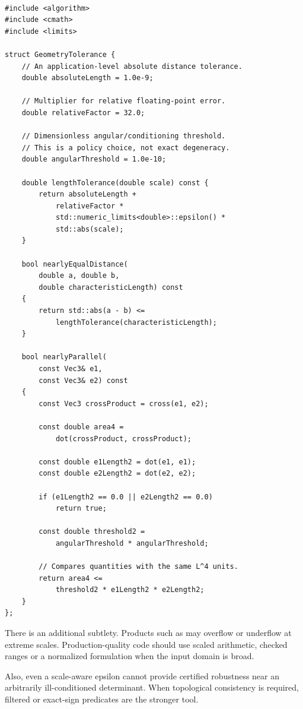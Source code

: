 \begin{verbatim}

#include <algorithm>
#include <cmath>
#include <limits>

struct GeometryTolerance {
    // An application-level absolute distance tolerance.
    double absoluteLength = 1.0e-9;

    // Multiplier for relative floating-point error.
    double relativeFactor = 32.0;

    // Dimensionless angular/conditioning threshold.
    // This is a policy choice, not exact degeneracy.
    double angularThreshold = 1.0e-10;

    double lengthTolerance(double scale) const {
        return absoluteLength +
            relativeFactor *
            std::numeric_limits<double>::epsilon() *
            std::abs(scale);
    }

    bool nearlyEqualDistance(
        double a, double b,
        double characteristicLength) const
    {
        return std::abs(a - b) <=
            lengthTolerance(characteristicLength);
    }

    bool nearlyParallel(
        const Vec3& e1,
        const Vec3& e2) const
    {
        const Vec3 crossProduct = cross(e1, e2);

        const double area4 =
            dot(crossProduct, crossProduct);

        const double e1Length2 = dot(e1, e1);
        const double e2Length2 = dot(e2, e2);

        if (e1Length2 == 0.0 || e2Length2 == 0.0)
            return true;

        const double threshold2 =
            angularThreshold * angularThreshold;

        // Compares quantities with the same L^4 units.
        return area4 <=
            threshold2 * e1Length2 * e2Length2;
    }
};
\end{verbatim}

There is an additional subtlety. Products such as  may overflow or underflow at extreme scales. Production-quality code should use scaled arithmetic, checked ranges or a normalized formulation when the input domain is broad.

Also, even a scale-aware epsilon cannot provide certified robustness near an arbitrarily ill-conditioned determinant. When topological consistency is required, filtered or exact-sign predicates are the stronger tool.

